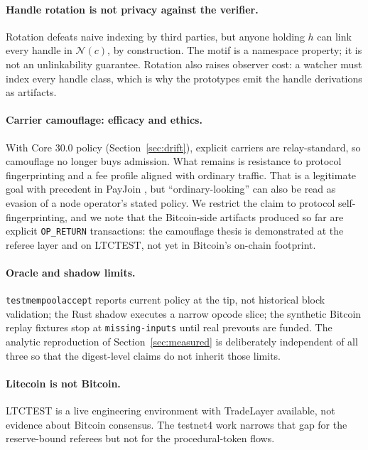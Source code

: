 \documentclass[11pt]{article}
\begin{document}
\paragraph{Handle rotation is not privacy against the verifier.} Rotation
defeats naive indexing by third parties, but anyone holding $h$ can link every
handle in $\mathcal{N}(c)$, by construction. The motif is a namespace property;
it is not an unlinkability guarantee. Rotation also raises observer cost: a
watcher must index every handle class, which is why the prototypes emit the
handle derivations as artifacts.

\paragraph{Carrier camouflage: efficacy and ethics.} With Core 30.0 policy
(Section~\ref{sec:drift}), explicit carriers are relay-standard, so camouflage
no longer buys admission. What remains is resistance to protocol
fingerprinting and a fee profile aligned with ordinary traffic. That is a
legitimate goal with precedent in PayJoin \cite{bip78}, but ``ordinary-looking''
can also be read as evasion of a node operator's stated policy. We restrict the
claim to protocol self-fingerprinting, and we note that the Bitcoin-side
artifacts produced so far are explicit \texttt{OP\_RETURN} transactions: the
camouflage thesis is demonstrated at the referee layer and on LTCTEST, not yet
in Bitcoin's on-chain footprint.

\paragraph{Oracle and shadow limits.} \texttt{testmempoolaccept} reports current
policy at the tip, not historical block validation; the Rust shadow executes a
narrow opcode slice; the synthetic Bitcoin replay fixtures stop at
\texttt{missing-inputs} until real prevouts are funded. The analytic
reproduction of Section~\ref{sec:measured} is deliberately independent of all
three so that the digest-level claims do not inherit those limits.

\paragraph{Litecoin is not Bitcoin.} LTCTEST is a live engineering environment
with TradeLayer available, not evidence about Bitcoin consensus. The testnet4
work narrows that gap for the reserve-bound referees but not for the
procedural-token flows.
\end{document}
